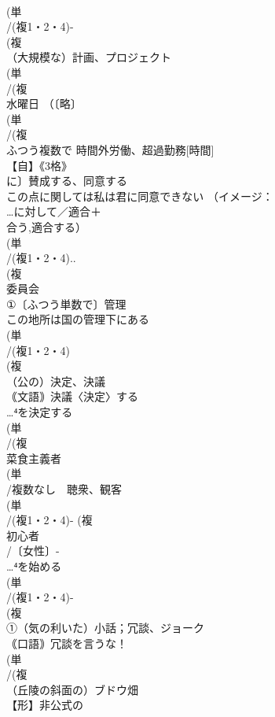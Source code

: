 \documentclass[8pt]{extreport}
\begin{document}
\begin{CJK}{UTF8}{min}
\\	(単
\\	/(複1・2・4)-
\\	(複
\\	（大規模な）計画、プロジェクト
\\	(単
\\	/(複
\\	水曜日 （〔略〕
\\	(単
\\	/(複
\\	ふつう複数で 時間外労働、超過勤務[時間] 
\\	【自】《3格》
\\	に〕賛成する、同意する 
\\	この点に関しては私は君に同意できない （イメージ：
\\	…に対して／適合＋
\\	合う,適合する）
\\	(単
\\	/(複1・2・4)..
\\	(複
\\	委員会 
\\	①〔ふつう単数で〕管理 
\\	この地所は国の管理下にある
\\	(単
\\	/(複1・2・4)
\\	(複
\\	（公の）決定、決議 
\\	｟文語｠決議〈決定〉する 
\\	…⁴を決定する
\\	(単
\\	/(複
\\	菜食主義者 
\\	(単
\\	/複数なし　聴衆、観客 
\\	(単
\\	/(複1・2・4)- (複
\\	初心者 
\\	/〔女性〕-
\\	…⁴を始める
\\	(単
\\	/(複1・2・4)-
\\	(複
\\	①（気の利いた）小話；冗談、ジョーク 
\\	｟口語｠冗談を言うな！
\\	(単
\\	/(複
\\	（丘陵の斜面の）ブドウ畑 
\\	【形】非公式の

\end{CJK}
\end{document}
